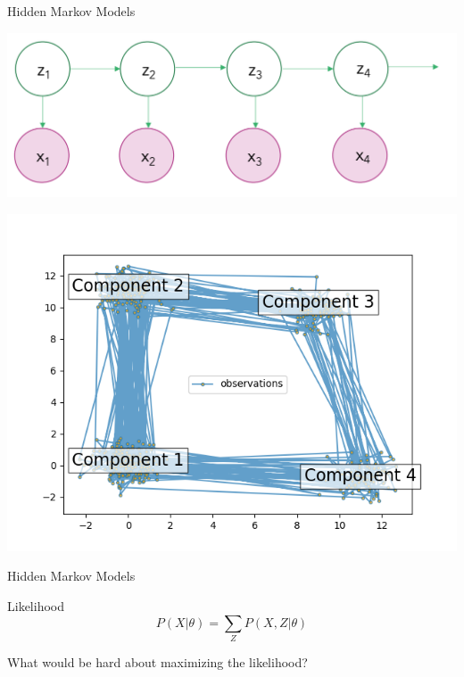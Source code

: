\documentclass[10pt]{beamer}
\begin{document}
\begin{frame}{Hidden Markov Models}

\begin{minipage}{0.5\textwidth}
\includegraphics[width=\textwidth]{images/hmm}
\end{minipage} 

\vfill
\begin{minipage}{0.5\textwidth}
\includegraphics[width=\textwidth]{images/hmm-sampling}
\end{minipage} 

\end{frame}

\begin{frame}{Hidden Markov Models}
\begin{sblock}{Likelihood}
$$P(X| \theta) = \sum_{Z} P(X, Z | \theta)$$
\end{sblock}

\begin{sblock}{What would be hard about maximizing the likelihood?}

\end{sblock}

\end{frame}
\end{document}
